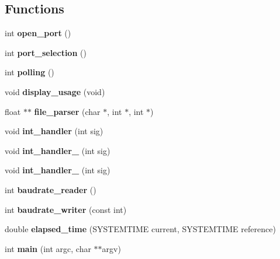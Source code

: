 \subsection*{Functions}
\begin{DoxyCompactItemize}
\item 
\mbox{\label{qbadmin_8c_abe553924eef0ba8079dc745caf1f348c}} 
int {\bfseries open\+\_\+port} ()
\item 
\mbox{\label{qbadmin_8c_a3939d4ef4a0e2be02b1eb9e1994ec985}} 
int {\bfseries port\+\_\+selection} ()
\item 
\mbox{\label{qbadmin_8c_a22b6aac07ec93fb920cc09b13175fa20}} 
int {\bfseries polling} ()
\item 
void \textbf{ display\+\_\+usage} (void)
\item 
float $\ast$$\ast$ \textbf{ file\+\_\+parser} (char $\ast$, int $\ast$, int $\ast$)
\item 
void \textbf{ int\+\_\+handler} (int sig)
\item 
void \textbf{ int\+\_\+handler\+\_} (int sig)
\item 
void \textbf{ int\+\_\+handler\+\_} (int sig)
\item 
int \textbf{ baudrate\+\_\+reader} ()
\item 
\mbox{\label{qbadmin_8c_abab28310fbbbcecb4658ce38e10ae89a}} 
int {\bfseries baudrate\+\_\+writer} (const int)
\item 
\mbox{\label{qbadmin_8c_aa13424f8e83a570e769decb4c02398d2}} 
double {\bfseries elapsed\+\_\+time} (S\+Y\+S\+T\+E\+M\+T\+I\+ME current, S\+Y\+S\+T\+E\+M\+T\+I\+ME reference)
\item 
int \textbf{ main} (int argc, char $\ast$$\ast$argv)
\end{DoxyCompactItemize}
